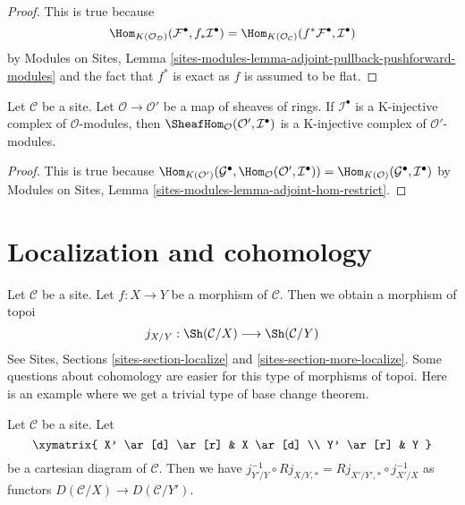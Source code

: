 \begin{proof}
This is true because
$$
\Hom_{K(\mathcal{O}_\mathcal{D})}(\mathcal{F}^\bullet, f_*\mathcal{I}^\bullet)
=
\Hom_{K(\mathcal{O}_\mathcal{C})}(f^*\mathcal{F}^\bullet, \mathcal{I}^\bullet)
$$
by
Modules on Sites, Lemma
\ref{sites-modules-lemma-adjoint-pullback-pushforward-modules}
and the fact that $f^*$ is exact as $f$ is assumed to be flat.
\end{proof}

\begin{lemma}
\label{lemma-hom-K-injective}
Let $\mathcal{C}$ be a site. Let $\mathcal{O} \to \mathcal{O}'$ be a map
of sheaves of rings. If $\mathcal{I}^\bullet$ is a K-injective complex of
$\mathcal{O}$-modules, then
$\SheafHom_\mathcal{O}(\mathcal{O}', \mathcal{I}^\bullet)$
is a K-injective complex of $\mathcal{O}'$-modules.
\end{lemma}

\begin{proof}
This is true because
$\Hom_{K(\mathcal{O}')}(\mathcal{G}^\bullet,
\Hom_\mathcal{O}(\mathcal{O}', \mathcal{I}^\bullet)) =
\Hom_{K(\mathcal{O})}(\mathcal{G}^\bullet, \mathcal{I}^\bullet)$
by Modules on Sites, Lemma \ref{sites-modules-lemma-adjoint-hom-restrict}.
\end{proof}






\section{Localization and cohomology}
\label{section-localization}

\noindent
Let $\mathcal{C}$ be a site. Let $f : X \to Y$ be a morphism of $\mathcal{C}$.
Then we obtain a morphism of topoi
$$
j_{X/Y} : \Sh(\mathcal{C}/X) \longrightarrow \Sh(\mathcal{C}/Y)
$$
See Sites, Sections \ref{sites-section-localize} and
\ref{sites-section-more-localize}. Some questions about
cohomology are easier for this type of morphisms of topoi.
Here is an example where we get a trivial type of base change theorem.

\begin{lemma}
\label{lemma-localize-cartesian-square}
Let $\mathcal{C}$ be a site. Let
$$
\xymatrix{
X' \ar[d] \ar[r] & X \ar[d] \\
Y' \ar[r] & Y
}
$$
be a cartesian diagram of $\mathcal{C}$. Then we have
$j_{Y'/Y}^{-1} \circ Rj_{X/Y, *} = Rj_{X'/Y', *} \circ j_{X'/X}^{-1}$
as functors $D(\mathcal{C}/X) \to D(\mathcal{C}/Y')$.
\end{lemma}

